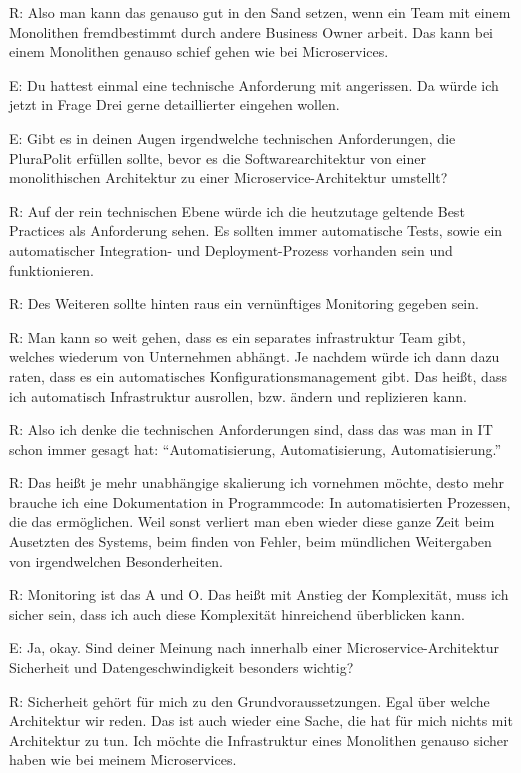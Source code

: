\label{appendix:r-25}
R: Also man kann das genauso gut in den Sand setzen, wenn ein Team mit einem Monolithen  fremdbestimmt durch andere Business Owner arbeit. Das kann bei einem Monolithen genauso schief gehen wie bei Microservices.

E: Du hattest einmal eine technische Anforderung mit angerissen. Da würde ich jetzt in Frage Drei gerne detaillierter eingehen wollen. 

E: Gibt es in deinen Augen irgendwelche technischen Anforderungen, die PluraPolit erfüllen sollte, bevor es die Softwarearchitektur von einer monolithischen Architektur zu einer Microservice-Architektur umstellt? 

\label{appendix:r-26} \label{appendix:r-27}
R: Auf der rein technischen Ebene würde ich die heutzutage geltende Best Practices als Anforderung sehen. Es sollten immer automatische Tests, sowie ein automatischer Integration- und Deployment-Prozess vorhanden sein und funktionieren.

\label{appendix:r-28}
R: Des Weiteren sollte hinten raus ein vernünftiges Monitoring gegeben sein.

R: Man kann so weit gehen, dass es ein separates infrastruktur Team gibt, welches wiederum von Unternehmen abhängt. Je nachdem würde ich dann dazu raten, dass es ein automatisches Konfigurationsmanagement gibt. Das heißt, dass ich automatisch Infrastruktur ausrollen, bzw. ändern und replizieren kann.

\label{appendix:r-29}
R: Also ich denke die technischen Anforderungen sind, dass das was man in IT schon immer gesagt hat:  “Automatisierung, Automatisierung, Automatisierung.”

\label{appendix:r-30}
R: Das heißt je mehr unabhängige skalierung ich vornehmen möchte, desto mehr brauche ich eine Dokumentation in Programmcode: In automatisierten Prozessen, die das ermöglichen.
Weil sonst verliert man eben wieder diese ganze Zeit beim Ausetzten des Systems, beim finden von Fehler, beim mündlichen Weitergaben von irgendwelchen Besonderheiten. 

\label{appendix:r-31}
R: Monitoring ist das A und O. Das heißt mit Anstieg der Komplexität, muss ich sicher sein, dass ich auch diese Komplexität hinreichend überblicken kann.

E: Ja, okay. Sind deiner Meinung nach innerhalb einer Microservice-Architektur Sicherheit und Datengeschwindigkeit besonders wichtig?

\label{appendix:r-32}
R: Sicherheit gehört für mich zu den Grundvoraussetzungen. Egal über welche Architektur wir reden. Das ist auch wieder eine Sache, die hat für mich nichts mit Architektur zu tun. Ich möchte  die Infrastruktur eines Monolithen genauso sicher haben wie bei meinem Microservices. 

